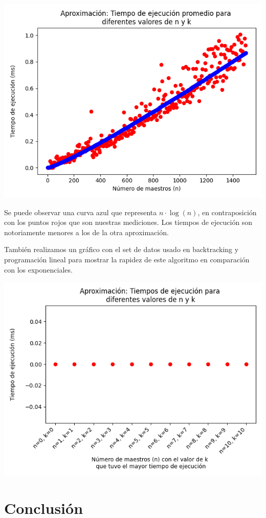\documentclass{article}
\begin{document}
\includegraphics[scale=0.60]{images/graficoAproxAdicional.png}

Se puede observar una curva azul que representa $n \cdot \log(n)$, en contraposición con los puntos rojos que son nuestras mediciones. Los tiempos de ejecución son notoriamente menores a los de la otra aproximación. 

También realizamos un gráfico con el set de datos usado en backtracking y programación lineal para mostrar la rapidez de este algoritmo en comparación con los exponenciales.

\includegraphics[scale=0.60]{images/graficoAproxAdicionalMediciones.png}

\section{Conclusión}
\end{document}
